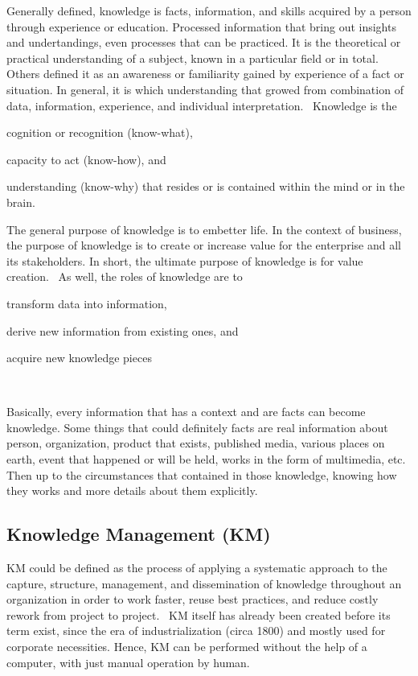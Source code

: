 Generally defined, knowledge is facts, information, and skills acquired by a person through experience or education.
Processed information that bring out insights and undertandings, even processes that can be practiced.
It is the theoretical or practical understanding of a subject, known in a particular field or in total.
Others defined it as an awareness or familiarity gained by experience of a fact or situation.
In general, it is which understanding that growed from combination of data, information, experience, and individual interpretation.~\autocite{BD2015Knowledge}
Knowledge is the
\begin{inparaenum}
\item cognition or recognition (know-what),
\item capacity to act (know-how), and
\item understanding (know-why) that resides or is contained within the mind or in the brain.
\end{inparaenum}
The general purpose of knowledge is to embetter life.
In the context of business, the purpose of knowledge is to create or increase value for the enterprise and all its stakeholders.
In short, the ultimate purpose of knowledge is for value creation.~\autocite{Liew2007Understanding}
As well, the roles of knowledge are to
\begin{inparaenum}
\item transform data into information,
\item derive new information from existing ones, and
\item acquire new knowledge pieces
\end{inparaenum}~\autocite{Pomerol2001Relation}

Basically, every information that has a context and are facts can become knowledge.
Some things that could definitely facts are real information about person, organization, product that exists, published media, various places on earth, event that happened or will be held, works in the form of multimedia, etc.
Then up to the circumstances that contained in those knowledge, knowing how they works and more details about them explicitly.

\subsection{Knowledge Management (KM)}

\ac{KM} could be defined as the process of applying a systematic approach to the capture, structure, management, and dissemination of knowledge throughout an organization in order to work faster, reuse best practices, and reduce costly rework from project to project.~\autocite{Dalkir2005KM}
\ac{KM} itself has already been created before its term exist, since the era of industrialization (circa 1800) and mostly used for corporate necessities.
Hence, \ac{KM} can be performed without the help of a computer, with just manual operation by human.

